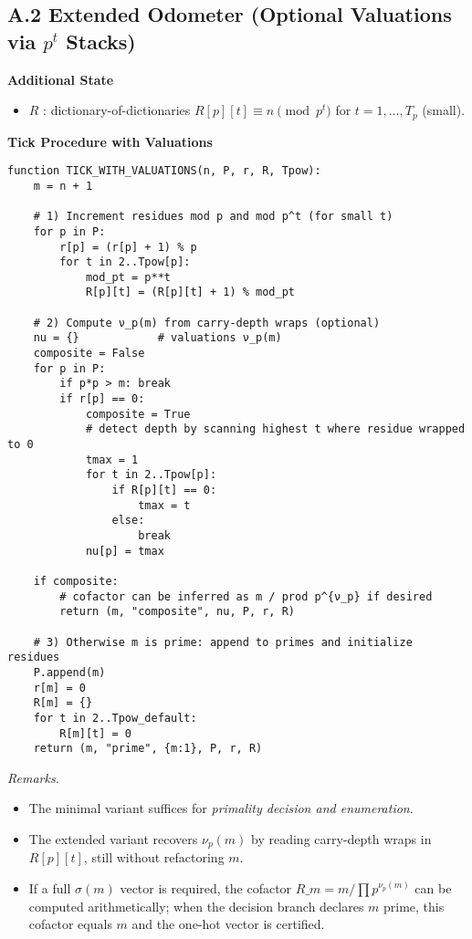 \documentclass[12pt]{article}
\theoremstyle{definition}
\theoremstyle{remark}
\begin{document}
\subsection*{A.2 Extended Odometer (Optional Valuations via \(p^t\) Stacks)}


\noindent\textbf{Additional State}
\begin{itemize}
  \item $R$ : dictionary-of-dictionaries $R[p][t] \equiv n \pmod{p^t}$ for $t=1,\dots,T_p$ (small).
\end{itemize}

\noindent\textbf{Tick Procedure with Valuations}
\begin{verbatim}
function TICK_WITH_VALUATIONS(n, P, r, R, Tpow):
    m = n + 1

    # 1) Increment residues mod p and mod p^t (for small t)
    for p in P:
        r[p] = (r[p] + 1) % p
        for t in 2..Tpow[p]:
            mod_pt = p**t
            R[p][t] = (R[p][t] + 1) % mod_pt

    # 2) Compute ν_p(m) from carry-depth wraps (optional)
    nu = {}            # valuations ν_p(m)
    composite = False
    for p in P:
        if p*p > m: break
        if r[p] == 0:
            composite = True
            # detect depth by scanning highest t where residue wrapped to 0
            tmax = 1
            for t in 2..Tpow[p]:
                if R[p][t] == 0:
                    tmax = t
                else:
                    break
            nu[p] = tmax

    if composite:
        # cofactor can be inferred as m / prod p^{ν_p} if desired
        return (m, "composite", nu, P, r, R)

    # 3) Otherwise m is prime: append to primes and initialize residues
    P.append(m)
    r[m] = 0
    R[m] = {}
    for t in 2..Tpow_default:
        R[m][t] = 0
    return (m, "prime", {m:1}, P, r, R)
\end{verbatim}

\noindent\emph{Remarks.}
\begin{itemize}
  \item The minimal variant suffices for \emph{primality decision and enumeration}.
  \item The extended variant recovers \(\nu_p(m)\) by reading carry-depth wraps in \(R[p][t]\),
        still without refactoring \(m\).
  \item If a full \(\sigma(m)\) vector is required, the cofactor \(R\_m = m / \prod p^{\nu_p(m)}\) can be
        computed arithmetically; when the decision branch declares \(m\) prime, this cofactor equals \(m\)
        and the one-hot vector is certified.
\end{itemize}
\end{document}
